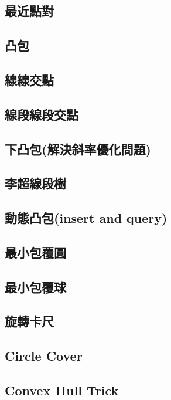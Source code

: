 \documentclass[a4paper,10pt,twocolumn,oneside]{article}
\begin{document}
\subsection{最近點對}

\subsection{凸包}

\subsection{線線交點}

\subsection{線段線段交點}

\subsection{下凸包(解決斜率優化問題)}

\subsection{李超線段樹}

\subsection{動態凸包(insert and query)}

\subsection{最小包覆圓}

\subsection{最小包覆球}

\subsection{旋轉卡尺}

\subsection{Circle Cover }

\subsection{Convex Hull Trick}

\end{document}
